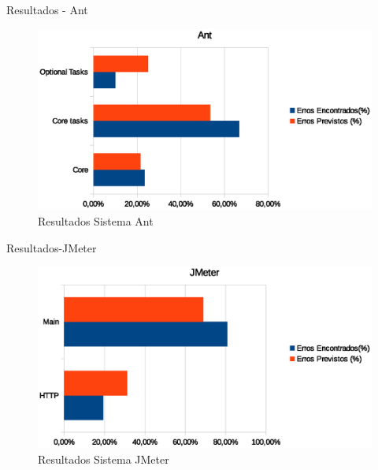 \documentclass[t,14pt,mathserif]{beamer}
\begin{document}
\begin{frame}{Resultados - Ant}

\begin{figure}[htbp]
\centering
\includegraphics[width=.80\textwidth]{../img/graph_ant.eps}
\caption{Resultados Sistema Ant}
\label{fig:avalicao_ant}
\end{figure}	


\end{frame}


\begin{frame}{Resultados-JMeter}

\begin{figure}[htbp]
\centering
\includegraphics[width=.80\textwidth]{../img/graph_jmeter.eps}
\caption{Resultados Sistema JMeter}
\label{fig:avalicao_jmeter}
\end{figure}
	


\end{frame}
\end{document}
